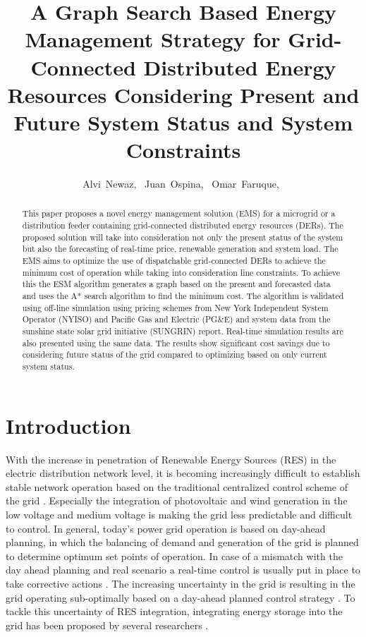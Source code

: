 \documentclass[journal]{IEEEtran}
\begin{document}
\title{A Graph Search Based Energy Management Strategy for Grid-Connected Distributed Energy Resources Considering Present and Future System Status and System Constraints}

\author{ Alvi~Newaz,~
Juan~Ospina,~
     Omar~Faruque,~
        }%





\maketitle
\IEEEpeerreviewmaketitle


\begin{abstract}
This paper proposes a novel energy management solution (EMS) for a microgrid or a distribution feeder containing grid-connected distributed energy resources (DERs). The proposed solution will take into consideration not only the present status of the system but also the forecasting of real-time price, renewable generation and system load. The EMS aims to optimize the use of dispatchable grid-connected DERs to achieve the minimum cost of operation while taking into consideration line constraints. To achieve this the ESM algorithm generates a graph based on the present and forecasted data and uses the A* search algorithm to find the minimum cost. The algorithm is validated using off-line simulation using pricing schemes from New York Independent System Operator (NYISO) and Pacific Gas and Electric (PG\&E) and system data from the sunshine state solar grid initiative (SUNGRIN) report. Real-time simulation results are also presented using the same data. The results show significant cost savings due to considering future status of the grid compared to optimizing based on only current system status.
\end{abstract}
\section{Introduction}
With the increase in penetration of Renewable Energy Sources (RES) in the electric distribution network level, it is becoming increasingly difficult to establish stable network operation based on the traditional centralized control scheme of the grid \cite{WHY}. Especially the integration of photovoltaic and wind generation in the low voltage and medium voltage is making the grid less predictable and difficult to control. In general, today's power grid operation is based on day-ahead planning, in which the balancing of demand and generation of the grid is planned to determine optimum set points of operation. In case of a mismatch with the day ahead planning and real scenario a real-time control is usually put in place to take corrective actions \cite{WHY2}. The increasing uncertainty in the grid is resulting in the grid operating sub-optimally based on a day-ahead planned control strategy \cite{WHY2}. To tackle this uncertainty of RES integration, integrating energy storage into the grid has been proposed by several researchers \cite{WHY2,ESI1,ES2,ES3}. 
\end{document}
